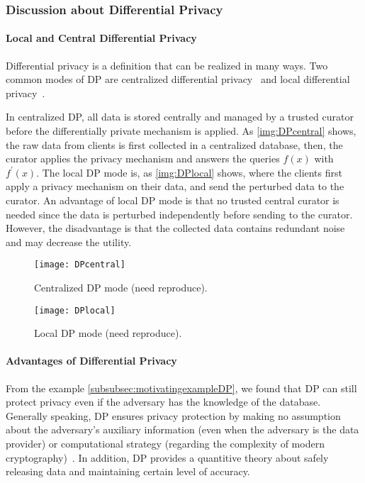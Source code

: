 \subsubsection{Discussion about Differential Privacy}

\paragraph{Local and Central Differential Privacy}
Differential privacy is a definition that can be realized in many ways. Two common modes of DP are centralized differential privacy~\cite{dwork2014algorithmic} and local differential privacy~\cite{dinur2003revealing}.

In centralized DP, all data is stored centrally and managed by a trusted curator before the differentially private mechanism is applied. As \autoref{img:DPcentral} shows, the raw data from clients is first collected in a centralized database, then, the curator applies the privacy mechanism and answers the queries $f\left(x\right)$ with $f^{\prime}\left(x\right)$.
The local DP mode is, as \autoref{img:DPlocal} shows, where the clients first apply a privacy mechanism on their data, and send the perturbed data to the curator.
An advantage of local DP mode is that no trusted central curator is needed since the data is perturbed independently before sending to the curator. However, the disadvantage is that the collected data contains redundant noise and may decrease the utility.

\begin{figure}[htbp]
    \texttt{[image: DPcentral]}
    \centering
    \caption{Centralized DP mode (need reproduce).}
    \label{img:DPcentral}
\end{figure}
\FloatBarrier

\begin{figure}[htbp]
    \texttt{[image: DPlocal]}
    \centering
    \caption{Local DP mode (need reproduce).}
    \label{img:DPlocal}
\end{figure}
\FloatBarrier


\paragraph{Advantages of Differential Privacy}
From the example \autoref{subsubsec:motivatingexampleDP}, we found that DP can still protect privacy even if the adversary has the knowledge of the database. Generally speaking, DP ensures privacy protection by making no assumption about the adversary's auxiliary information (even when the adversary is the data provider) or computational strategy (regarding the complexity of modern cryptography)~\cite{vadhan2017complexity}. In addition, DP provides a quantitive theory about safely releasing data and maintaining certain level of accuracy.

